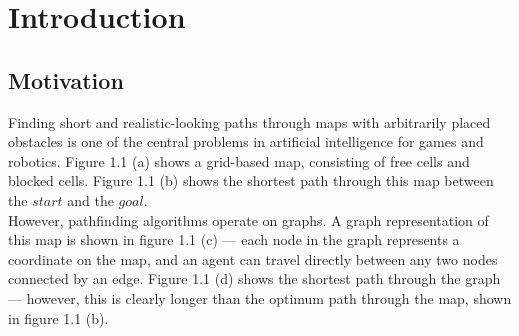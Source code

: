 \documentclass[12pt,notitlepage]{report}
\begin{document}
\chapter{Introduction}

\section{Motivation}

Finding short and realistic-looking paths through maps with arbitrarily placed obstacles is one of the central problems in artificial intelligence for games and robotics. Figure 1.1 (a) shows a grid-based map, consisting of free cells and blocked cells. Figure 1.1 (b) shows the shortest path through this map between the $start$ and the $goal$.\\

\noindent
However, pathfinding algorithms operate on graphs. A graph representation of this map is shown in figure 1.1 (c) --- each node in the graph represents a coordinate on the map, and an agent can travel directly between any two nodes connected by an edge. Figure 1.1 (d) shows the shortest path through the graph --- however, this is clearly longer than the optimum path through the map, shown in figure 1.1 (b).\\
\end{document}
